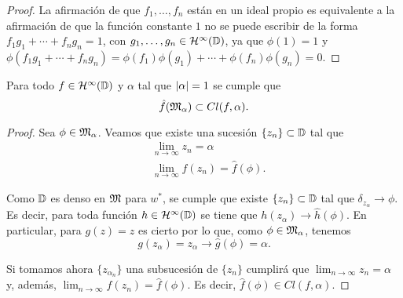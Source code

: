 \begin{proof}
La afirmación de que $f_1, \dots, f_n$ están en un ideal propio es equivalente a la afirmación de que la función constante $1$ no se puede escribir de la forma $f_1 g_1 + \cdots + f_n g_n = 1$, con $g_1, \dots, g_n \in \mathcal{H}^{\infty}(\mathbb{D})$, ya que $\phi (1) = 1$ y $\phi (f_1 g_1 + \cdots + f_n g_n) = \phi (f_1) \phi (g_1) + \cdots + \phi (f_n) \phi (g_n) = 0$.

\end{proof}

\begin{prop}
    Para todo $f \in \mathcal{H}^{\infty}(\mathbb{D})$ y $\alpha$ tal que $\left\lvert\alpha\right\rvert = 1$ se cumple que
    \begin{equation*}
        \hat{f} (\mathfrak{M}_\alpha) \subset Cl(f, \alpha).
    \end{equation*}
\end{prop}

\begin{proof}
    Sea $\phi \in \mathfrak{M}_\alpha$. Veamos que existe una sucesión $\{ z_n\} \subset \mathbb{D}$ tal que
     \leqnomode
    \begin{align}
        & \lim_{n \rightarrow \infty} z_n = \alpha \\
        & \lim_{n \rightarrow \infty} f(z_n)= \hat{f} (\phi).
    \end{align}

    Como $\mathbb{D}$ es denso en $\mathfrak{M}$ para $w^*$, se cumple que existe $\{z_n\} \subset \mathbb{D}$ tal que $\delta_{z_\alpha} \rightarrow \phi$. Es decir, para toda función $h \in \mathcal{H}^{\infty}(\mathbb{D})$ se tiene que $h (z_\alpha) \rightarrow \hat{h} (\phi)$. En particular, para $g(z) = z$ es cierto por lo que, como $\phi \in \mathfrak{M}_\alpha$, tenemos
    \begin{equation*}
        g(z_\alpha) = z_\alpha \rightarrow \hat{g} (\phi) = \alpha.
    \end{equation*}

    Si tomamos ahora $\{z_{\alpha_n}\}$ una subsucesión de $\{z_n\}$ cumplirá que $\lim_{n \rightarrow \infty} z_n = \alpha$ y, además, $\lim_{n \rightarrow \infty} f(z_n)= \hat{f} (\phi)$. Es decir, $\hat{f} (\phi) \in Cl (f, \alpha)$.
\end{proof}
